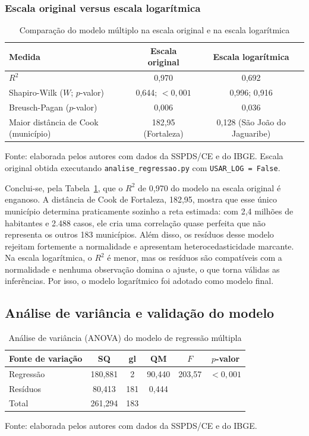 \documentclass[12pt,a4paper]{article}
\newcommand{\fonte}[1]{
	\vspace{-2mm}
	\begin{center}\footnotesize Fonte: #1\end{center}
}
\newcommand{\fontedados}{elaborada pelos autores com dados da SSPDS/CE e do IBGE.}
\begin{document}
	\subsubsection{Escala original versus escala logarítmica}
	\label{sec:escala}
	
	\begin{table}[H]
		\centering
		\caption{Comparação do modelo múltiplo na escala original e na escala logarítmica}
		\label{tab:escala}
		\begin{tabular}{lcc}
			\toprule
			\textbf{Medida} & \textbf{Escala original} & \textbf{Escala logarítmica} \\
			\midrule
			$R^2$                                   & 0,970 & 0,692 \\
			Shapiro-Wilk ($W$; $p$-valor)           & 0,644; $<0{,}001$ & 0,996; 0,916 \\
			Breusch-Pagan ($p$-valor)               & 0,006 & 0,036 \\
			Maior distância de Cook (município)     & 182,95 (Fortaleza) & 0,128 (São João do Jaguaribe) \\
			\bottomrule
		\end{tabular}
	\end{table}
	\fonte{\fontedados{} Escala original obtida executando \texttt{analise\_regressao.py} com \texttt{USAR\_LOG = False}.}
	
	Conclui-se, pela Tabela~\ref{tab:escala}, que o $R^2$ de 0,970 do modelo na escala original é enganoso. A distância de Cook de Fortaleza, 182,95, mostra que esse único município determina praticamente sozinho a reta estimada: com 2,4 milhões de habitantes e 2.488 casos, ele cria uma correlação quase perfeita que não representa os outros 183 municípios. Além disso, os resíduos desse modelo rejeitam fortemente a normalidade e apresentam heterocedasticidade marcante. Na escala logarítmica, o $R^2$ é menor, mas os resíduos são compatíveis com a normalidade e nenhuma observação domina o ajuste, o que torna válidas as inferências. Por isso, o modelo logarítmico foi adotado como modelo final.
	
	\subsection{Análise de variância e validação do modelo}
	
	\begin{table}[H]
		\centering
		\caption{Análise de variância (ANOVA) do modelo de regressão múltipla}
		\label{tab:anova}
		\begin{tabular}{lccccc}
			\toprule
			\textbf{Fonte de variação} & \textbf{SQ} & \textbf{gl} & \textbf{QM} & \textbf{$F$} & \textbf{$p$-valor} \\
			\midrule
			Regressão & 180,881 & 2   & 90,440 & 203,57 & $<0{,}001$ \\
			Resíduos  & 80,413  & 181 & 0,444  &        &  \\
			Total     & 261,294 & 183 &        &        &  \\
			\bottomrule
		\end{tabular}
	\end{table}
	\fonte{\fontedados}
	
\end{document}
